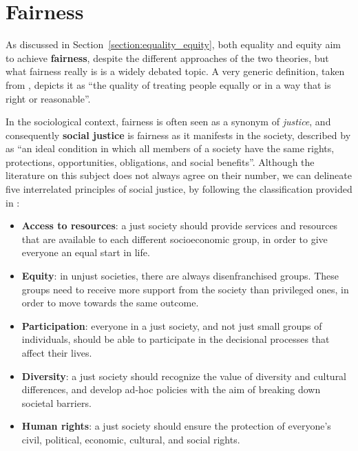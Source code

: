 \section{Fairness}
As discussed in Section~\ref{section:equality_equity}, both equality and equity aim to achieve \textbf{fairness}, despite the different approaches of the two theories, but what fairness really is is a widely debated topic. A very generic definition, taken from \cite{cambridge2013fairness}, depicts it as ``the quality of treating people equally or in a way that is right or reasonable''.

In the sociological context, fairness is often seen as a synonym of \textit{justice}, and consequently \textbf{social justice} is fairness as it manifests in the society, described by \cite[p.~405]{barker2003social} as ``an ideal condition in which all members of a society have the same rights, protections, opportunities, obligations, and social benefits''. Although the literature on this subject does not always agree on their number, we can delineate five interrelated principles of social justice, by following the classification provided in \cite{corporate2020social}:
\begin{itemize}
\item \textbf{Access to resources}: a just society should provide services and resources that are available to each different socioeconomic group, in order to give everyone an equal start in life.
\item \textbf{Equity}: in unjust societies, there are always disenfranchised groups. These groups need to receive more support from the society than privileged ones, in order to move towards the same outcome.
\item \textbf{Participation}: everyone in a just society, and not just small groups of individuals, should be able to participate in the decisional processes that affect their lives.
\item \textbf{Diversity}: a just society should recognize the value of diversity and cultural differences, and develop ad-hoc policies with the aim of breaking down societal barriers.
\item \textbf{Human rights}: a just society should ensure the protection of everyone's civil, political, economic, cultural, and social rights.
\end{itemize}

